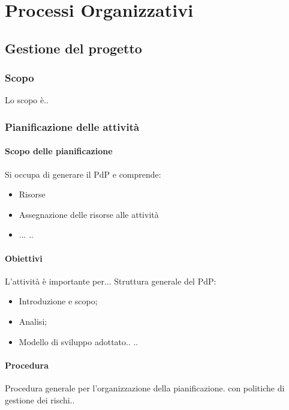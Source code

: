 \section{Processi Organizzativi}

    \subsection{Gestione del progetto}

	    \subsubsection{Scopo}
	    Lo scopo è..
	    
		
		\subsubsection{Pianificazione delle attività}
		
			\paragraph{Scopo delle pianificazione}
			Si occupa di generare il PdP e comprende:
			\begin{itemize}
				\item Risorse
				\item Assegnazione delle risorse alle attività
				\item ...
				..
			\end{itemize}
		
			\paragraph{Obiettivi}
			L'attività è importante per...
			Struttura generale del PdP:
			\begin{itemize}
				\item Introduzione e scopo;
				\item Analisi;
				\item Modello di sviluppo adottato..
				..
			\end{itemize}
		
			\paragraph{Procedura}	
			Procedura generale per l’organizzazione della pianificazione.
			con politiche di gestione dei rischi..
			
